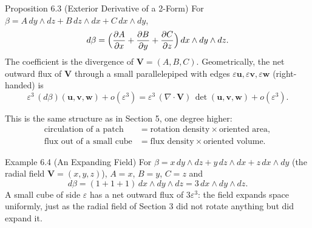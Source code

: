 \documentclass[11pt,letterpaper]{article}
\begin{document}
\begin{theorembox}{Proposition 6.3 (Exterior Derivative of a 2-Form)}
For $\beta=A\,dy\wedge dz+B\,dz\wedge dx+C\,dx\wedge dy$,
\begin{equation}
  d\beta=\Bigl(\frac{\partial A}{\partial x}+\frac{\partial B}{\partial y}
  +\frac{\partial C}{\partial z}\Bigr)\,dx\wedge dy\wedge dz .
\end{equation}
The coefficient is the divergence of $\mathbf{V}=(A,B,C)$. Geometrically, the
net outward flux of $\mathbf{V}$ through a small parallelepiped with edges
$\varepsilon\mathbf{u},\varepsilon\mathbf{v},\varepsilon\mathbf{w}$
(right-handed) is
\[
  \varepsilon^3\,(d\beta)(\mathbf{u},\mathbf{v},\mathbf{w})+o(\varepsilon^3)
  =\varepsilon^3\,(\nabla\cdot\mathbf{V})\,
  \det(\mathbf{u},\mathbf{v},\mathbf{w})+o(\varepsilon^3).
\]
\end{theorembox}

This is the same structure as in Section 5, one degree higher:
\begin{align*}
  \text{circulation of a patch}&=\text{rotation density}\times\text{oriented area},\\
  \text{flux out of a small cube}&=\text{flux density}\times\text{oriented volume}.
\end{align*}

\begin{examplebox}{Example 6.4 (An Expanding Field)}
For $\beta=x\,dy\wedge dz+y\,dz\wedge dx+z\,dx\wedge dy$ (the radial field
$\mathbf{V}=(x,y,z)$), $A=x$, $B=y$, $C=z$ and
\[
  d\beta=(1+1+1)\,dx\wedge dy\wedge dz=3\,dx\wedge dy\wedge dz .
\]
A small cube of side $\varepsilon$ has a net outward flux of
$3\varepsilon^3$: the field expands space uniformly, just as the radial field of
Section 3 did not rotate anything but did expand it.
\end{examplebox}
\end{document}
